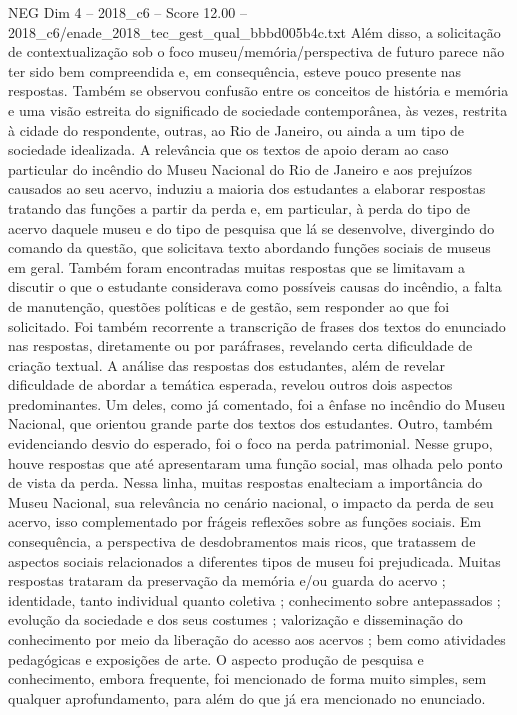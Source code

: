 \begin{textsample}{NEG Dim 4 – 2018\_c6 – Score 12.00 – 2018\_c6/enade\_2018\_tec\_gest\_qual\_bbbd005b4c.txt}
Além disso, a solicitação de contextualização sob o foco museu/memória/perspectiva de futuro parece não ter sido bem compreendida e, em consequência, esteve pouco presente nas respostas.
Também se observou confusão entre os conceitos de história e memória e uma visão estreita do significado de sociedade contemporânea, às vezes, restrita à cidade do respondente, outras, ao Rio de Janeiro, ou ainda a um tipo de sociedade idealizada.
A relevância que os textos de apoio deram ao caso particular do incêndio do Museu Nacional do Rio de Janeiro e aos prejuízos causados ao seu acervo, induziu a maioria dos estudantes a elaborar respostas tratando das funções a partir da perda e, em particular, à perda do tipo de acervo daquele museu e do tipo de pesquisa que lá se desenvolve, divergindo do comando da questão, que solicitava texto abordando funções sociais de museus em geral.
Também foram encontradas muitas respostas que se limitavam a discutir o que o estudante considerava como possíveis causas do incêndio, a falta de manutenção, questões políticas e de gestão, sem responder ao que foi solicitado.
Foi também recorrente a transcrição de frases dos textos do enunciado nas respostas, diretamente ou por paráfrases, revelando certa dificuldade de criação textual.
A análise das respostas dos estudantes, além de revelar dificuldade de abordar a temática esperada, revelou outros dois aspectos predominantes.
Um deles, como já comentado, foi a ênfase no incêndio do Museu Nacional, que orientou grande parte dos textos dos estudantes.
Outro, também evidenciando desvio do esperado, foi o foco na perda patrimonial.
Nesse grupo, houve respostas que até apresentaram uma função social, mas olhada pelo ponto de vista da perda.
Nessa linha, muitas respostas enalteciam a importância do Museu Nacional, sua relevância no cenário nacional, o impacto da perda de seu acervo, isso complementado por frágeis reflexões sobre as funções sociais.
Em consequência, a perspectiva de desdobramentos mais ricos, que tratassem de aspectos sociais relacionados a diferentes tipos de museu foi prejudicada.
Muitas respostas trataram da preservação da memória e/ou guarda do acervo ; identidade, tanto individual quanto coletiva ; conhecimento sobre antepassados ; evolução da sociedade e dos seus costumes ; valorização e disseminação do conhecimento por meio da liberação do acesso aos acervos ; bem como atividades pedagógicas e exposições de arte.
O aspecto produção de pesquisa e conhecimento, embora frequente, foi mencionado de forma muito simples, sem qualquer aprofundamento, para além do que já era mencionado no enunciado.

\end{textsample}
